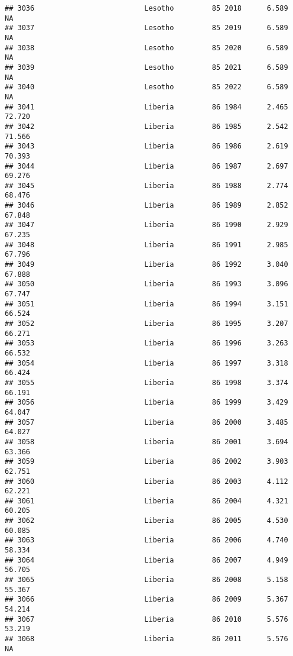\documentclass[
]{article}
\begin{document}
\begin{verbatim}
## 3036                          Lesotho         85 2018      6.589         NA
## 3037                          Lesotho         85 2019      6.589         NA
## 3038                          Lesotho         85 2020      6.589         NA
## 3039                          Lesotho         85 2021      6.589         NA
## 3040                          Lesotho         85 2022      6.589         NA
## 3041                          Liberia         86 1984      2.465     72.720
## 3042                          Liberia         86 1985      2.542     71.566
## 3043                          Liberia         86 1986      2.619     70.393
## 3044                          Liberia         86 1987      2.697     69.276
## 3045                          Liberia         86 1988      2.774     68.476
## 3046                          Liberia         86 1989      2.852     67.848
## 3047                          Liberia         86 1990      2.929     67.235
## 3048                          Liberia         86 1991      2.985     67.796
## 3049                          Liberia         86 1992      3.040     67.888
## 3050                          Liberia         86 1993      3.096     67.747
## 3051                          Liberia         86 1994      3.151     66.524
## 3052                          Liberia         86 1995      3.207     66.271
## 3053                          Liberia         86 1996      3.263     66.532
## 3054                          Liberia         86 1997      3.318     66.424
## 3055                          Liberia         86 1998      3.374     66.191
## 3056                          Liberia         86 1999      3.429     64.047
## 3057                          Liberia         86 2000      3.485     64.027
## 3058                          Liberia         86 2001      3.694     63.366
## 3059                          Liberia         86 2002      3.903     62.751
## 3060                          Liberia         86 2003      4.112     62.221
## 3061                          Liberia         86 2004      4.321     60.205
## 3062                          Liberia         86 2005      4.530     60.085
## 3063                          Liberia         86 2006      4.740     58.334
## 3064                          Liberia         86 2007      4.949     56.705
## 3065                          Liberia         86 2008      5.158     55.367
## 3066                          Liberia         86 2009      5.367     54.214
## 3067                          Liberia         86 2010      5.576     53.219
## 3068                          Liberia         86 2011      5.576         NA

\end{verbatim}
\end{document}
